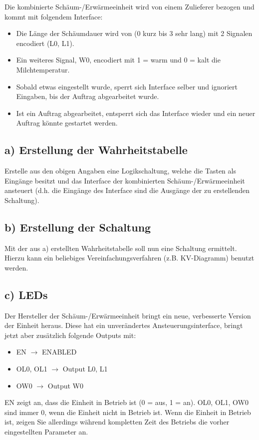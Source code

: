\documentclass[a4paper]{scrartcl}
\begin{document}
Die kombinierte Schäum-/Erwärmeeinheit wird von einem Zulieferer bezogen und kommt mit folgendem Interface:
\begin{itemize}
	\item Die Länge der Schäumdauer wird von (0 kurz bis 3 sehr lang) mit 2 Signalen encodiert (L0, L1).
	\item Ein weiteres Signal, W0, encodiert mit 1 = warm und 0 = kalt die Milchtemperatur.
	\item Sobald etwas eingestellt wurde, sperrt sich Interface selber und ignoriert Eingaben, bis der Auftrag abgearbeitet wurde.
	\item Ist ein Auftrag abgearbeitet, entsperrt sich das Interface wieder und ein neuer Auftrag könnte gestartet werden.
\end{itemize}


\subsection*{a) Erstellung der Wahrheitstabelle}
Erstelle aus den obigen Angaben eine Logikschaltung, welche die Tasten als Eingänge besitzt und das Interface der kombinierten Schäum-/Erwärmeeinheit ansteuert (d.h. die Eingänge des Interface sind die Ausgänge der zu erstellenden Schaltung).

\subsection*{b) Erstellung der Schaltung}
Mit der aus a) erstellten Wahrheitstabelle soll nun eine Schaltung ermittelt. Hierzu kann ein beliebiges Vereinfachungsverfahren (z.B. KV-Diagramm) benutzt werden.

\subsection*{c) LEDs}
Der Hersteller der Schäum-/Erwärmeeinheit bringt ein neue, verbesserte Version der Einheit heraus. Diese hat ein unverändertes Ansteuerungsinterface, bringt jetzt aber zusätzlich folgende Outputs mit:
\begin{itemize}
	\item EN $\rightarrow$ ENABLED
	\item OL0, OL1 $\rightarrow$ Output L0, L1
	\item OW0 $\rightarrow$ Output W0
\end{itemize}
EN zeigt an, dass die Einheit in Betrieb ist (0 = aus, 1 = an). OL0, OL1, OW0 sind immer 0, wenn die Einheit nicht in Betrieb ist. Wenn die Einheit in Betrieb ist, zeigen Sie allerdings während kompletten Zeit des Betriebs die vorher eingestellten Parameter an.\\
\end{document}
